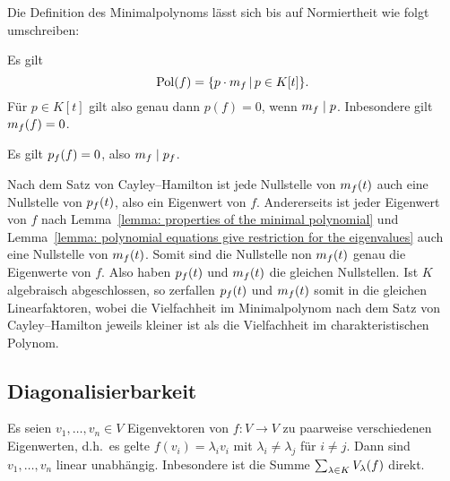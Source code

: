 Die Definition des Minimalpolynoms lässt sich bis auf Normiertheit wie folgt umschreiben:

\begin{lemma}
  \label{lemma: properties of the minimal polynomial}
  Es gilt
  \[
      \operatorname{Pol}(f)
    = \{ p \cdot m_{f} \,|\, p \in K[t] \}.
  \]
  Für $p \in K[t]$ gilt also genau dann $p(f) = 0$, wenn $m_{f} \mid p$.
  Inbesondere gilt $m_{f}(f) = 0$.
\end{lemma}

\begin{theorem}
  Es gilt $p_{f}(f) = 0$, also $m_{f} \mid p_{f}$.
\end{theorem}

Nach dem Satz von Cayley--Hamilton ist jede Nullstelle von $m_{f}(t)$ auch eine Nullstelle von $p_{f}(t)$, also ein Eigenwert von $f$.
Andererseits ist jeder Eigenwert von $f$ nach Lemma~\ref{lemma: properties of the minimal polynomial} und Lemma~\ref{lemma: polynomial equations give restriction for the eigenvalues} auch eine Nullstelle von $m_{f}(t)$.
Somit sind die Nullstelle non $m_{f}(t)$ genau die Eigenwerte von $f$.
Also haben $p_{f}(t)$ und $m_{f}(t)$ die gleichen Nullstellen.
Ist $K$ algebraisch abgeschlossen, so zerfallen $p_{f}(t)$ und $m_{f}(t)$ somit in die gleichen Linearfaktoren, wobei die Vielfachheit im Minimalpolynom nach dem Satz von Cayley--Hamilton jeweils kleiner ist als die Vielfachheit im charakteristischen Polynom.





\subsection{Diagonalisierbarkeit}

\begin{lemma}
  Es seien $v_1, \dotsc, v_n \in V$ Eigenvektoren von $f \colon V \to V$ zu paarweise verschiedenen Eigenwerten, d.h.\ es gelte $f(v_i) = \lambda_i v_i$ mit $\lambda_i \neq \lambda_j$ für $i \neq j$.
  Dann sind $v_1, \dotsc, v_n$ linear unabhängig.
  Inbesondere ist die Summe $\sum_{\lambda \in K} V_{\lambda}(f)$ direkt.
\end{lemma}

